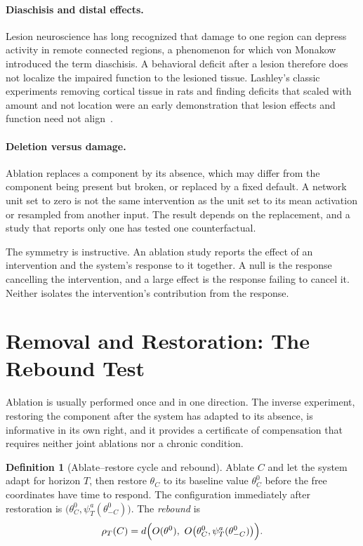 \documentclass[11pt]{article}
\theoremstyle{definition}
\newtheorem{definition}[theorem]{Definition}
\theoremstyle{remark}
\begin{document}
\paragraph{Diaschisis and distal effects.}
Lesion neuroscience has long recognized that damage to one region can depress activity in remote connected regions, a phenomenon for which von Monakow introduced the term diaschisis. A behavioral deficit after a lesion therefore does not localize the impaired function to the lesioned tissue. Lashley's classic experiments removing cortical tissue in rats and finding deficits that scaled with amount and not location were an early demonstration that lesion effects and function need not align~\cite{lashley1950}.

\paragraph{Deletion versus damage.}
Ablation replaces a component by its absence, which may differ from the component being present but broken, or replaced by a fixed default. A network unit set to zero is not the same intervention as the unit set to its mean activation or resampled from another input. The result depends on the replacement, and a study that reports only one has tested one counterfactual.

The symmetry is instructive. An ablation study reports the effect of an intervention and the system's response to it together. A null is the response cancelling the intervention, and a large effect is the response failing to cancel it. Neither isolates the intervention's contribution from the response.


\section{Removal and Restoration: The Rebound Test}\label{sec:restore}

Ablation is usually performed once and in one direction. The inverse experiment, restoring the component after the system has adapted to its absence, is informative in its own right, and it provides a certificate of compensation that requires neither joint ablations nor a chronic condition.

\begin{definition}[Ablate--restore cycle and rebound]
Ablate $C$ and let the system adapt for horizon $T$, then restore $\theta_C$ to its baseline value $\theta^0_C$ before the free coordinates have time to respond. The configuration immediately after restoration is $\bigl(\theta^0_C,\psi^a_T(\theta^0_{-C})\bigr)$. The \emph{rebound} is
\[
\rho_T(C)=d\Bigl(O(\theta^0),\ O\bigl(\theta^0_C,\psi^a_T(\theta^0_{-C})\bigr)\Bigr).
\]
\end{definition}
\end{document}
